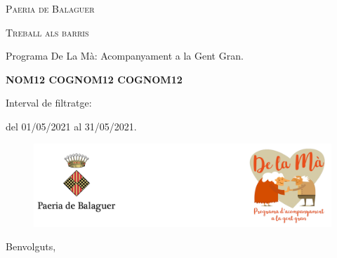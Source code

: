 \documentclass[a4paper,12pt]{elsarticle}  %
\begin{document}
 	


\begin{titlepage}
	\centering

	{\scshape\LARGE Paeria de Balaguer \par}


			\vfill


	{\scshape\Large Treball als barris\par}

	
			\vspace{0.5cm}

	
	{\Large Programa De La Mà: Acompanyament a la Gent Gran.\par}

			

			\vfill



	{\Large\bfseries NOM12 COGNOM12 COGNOM12 \par}
	


			\vfill



	{\large Interval de filtratge:\par}
	{\large del 01/05/2021 al 31/05/2021.\par}
		

\end{titlepage}



\clearpage







\FloatBarrier
\begin{figure}[h]
	\centering	
	\includegraphics[width=1\textwidth]{../IMATGES/logoPaeriaMa.png}
\end{figure}
\FloatBarrier	

\vfill









\noindent Benvolguts,

	\vspace{0.5cm}
\end{document}
